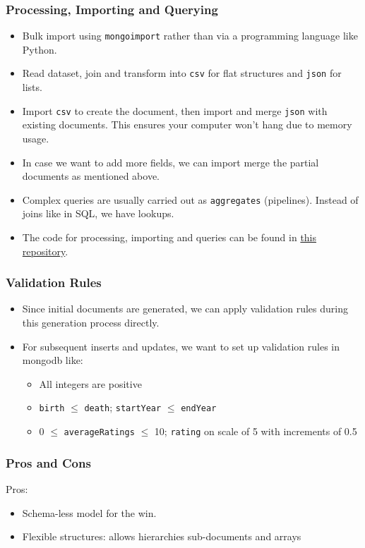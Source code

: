 \documentclass[10pt,titlepage]{article}
\begin{document}
\subsubsection{Processing, Importing and Querying}
\begin{itemize}
    \item Bulk import using \texttt{mongoimport} rather than via a programming language like Python.
    \item Read dataset, join and transform into \texttt{csv} for flat structures and \texttt{json} for lists.
    \item Import \texttt{csv} to create the document, then import and merge \texttt{json} with existing documents. This
        ensures your computer won't hang due to memory usage.
    \item In case we want to add more fields, we can import merge the partial documents as mentioned above.
    \item Complex queries are usually carried out as \texttt{aggregates} (pipelines). Instead of joins like in SQL, we
        have lookups.
    \item The code for processing, importing and queries can be found in \href{https://github.com/recurze/MiniMovieDB}{this repository}.

\end{itemize}

\subsubsection{Validation Rules}
\begin{itemize}
    \item Since initial documents are generated, we can apply validation rules during this generation process directly.
    \item For subsequent inserts and updates, we want to set up validation rules in mongodb like:
        \begin{itemize}
            \item All integers are positive
            \item \texttt{birth} $\le$ \texttt{death}; \texttt{startYear} $\le$ \texttt{endYear}
            \item 0 $\le$ \texttt{averageRatings} $\le$ 10; \texttt{rating} on scale of 5 with increments
                of 0.5
        \end{itemize}
\end{itemize}

\subsubsection{Pros and Cons}
Pros:
\begin{itemize}
    \item Schema-less model for the win.
    \item Flexible structures: allows hierarchies sub-documents and arrays
\end{itemize}
\end{document}
